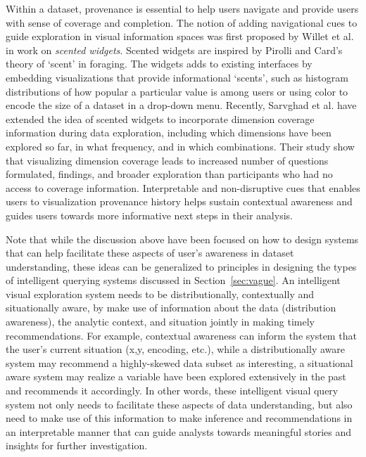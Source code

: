 \par Within a dataset, provenance is essential to help users navigate and provide users with sense of coverage and completion. The notion of adding navigational cues to guide exploration in visual information spaces was first proposed by Willet et al.\cite{Willett2007} in work on \textit{scented widgets}. Scented widgets are inspired by Pirolli and Card's theory of `scent' in foraging. The widgets adds to existing interfaces by embedding visualizations that provide informational `scents', such as histogram distributions of how popular a particular value is among users or using color to encode the size of a dataset in a drop-down menu. Recently, Sarvghad et al. \cite{Sarvghad2017} have extended the idea of scented widgets to incorporate dimension coverage information during data exploration, including which dimensions have been explored so far, in what frequency, and in which combinations. Their study show that visualizing dimension coverage leads to increased number of questions formulated, findings, and broader exploration than participants who had no access to coverage information. Interpretable and non-disruptive cues that enables users to visualization provenance history helps sustain contextual awareness and guides users towards more informative next steps in their analysis.

\par Note that while the discussion above have been focused on how to design systems that can help facilitate these aspects of user's awareness in dataset understanding, these ideas can be generalized to principles in designing the types of intelligent querying systems discussed in Section~\ref{sec:vague}. An intelligent visual exploration system needs to be distributionally, contextually and situationally aware, by make use of information about the data (distribution awareness), the analytic context, and situation jointly in making timely recommendations. For example, contextual awareness can inform the system that the user's current situation (x,y, encoding, etc.), while a distributionally aware system may recommend a highly-skewed data subset as interesting, a situational aware system may realize a variable have been explored extensively in the past and recommends it accordingly. In other words, these intelligent visual query system not only needs to facilitate these aspects of data understanding, but also need to make use of this information to make inference and recommendations in an interpretable manner that can guide analysts towards meaningful stories and insights for further investigation.

